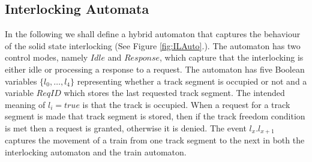 \subsection*{Interlocking Automata}
In the following we shall define a hybrid automaton that captures the behaviour of the solid state interlocking (See Figure \ref{fig:ILAuto}.).  The automaton has two control modes, namely $Idle$ and $Response$, which capture that the interlocking is either idle or processing a response to a request.  The automaton has five Boolean variables $\{ l_0, \ldots ,l_4 \}$ representing whether a track segment is occupied or not and a variable $ReqID$ which stores the last requested track segment. The intended meaning of $l_i = true$ is that the track is occupied.  When a request for a track segment is made that track segment is stored, then if the track freedom condition is met then a request is granted, otherwise it is denied. The event $l_x.l_{x+1}$ captures the movement of a train from one track segment to the next in both the interlocking automaton and the train automaton.
\medskip
